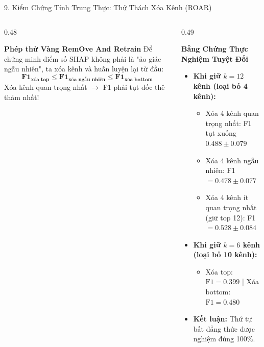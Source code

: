 \documentclass[aspectratio=169,10pt]{beamer}
\begin{document}
\begin{frame}{9. Kiểm Chứng Tính Trung Thực: Thử Thách Xóa Kênh (ROAR)}
    \begin{columns}[T]
        \begin{column}{0.48\textwidth}
            \begin{block}{\textbf{Phép thử Vàng RemOve And Retrain}}
                \footnotesize
                Để chứng minh điểm số SHAP không phải là "ảo giác ngẫu nhiên", ta xóa kênh và huấn luyện lại từ đầu:
                \[
                    \mathbf{\text{F1}_{\text{xóa top}} \le \text{F1}_{\text{xóa ngẫu nhiên}} \le \text{F1}_{\text{xóa bottom}}}
                \]
                Xóa kênh quan trọng nhất $\to$ F1 phải tụt dốc thê thảm nhất!
            \end{block}
        \end{column}
        
        \begin{column}{0.49\textwidth}
            \begin{exampleblock}{\textbf{Bằng Chứng Thực Nghiệm Tuyệt Đối}}
                \scriptsize
                \begin{itemize}
                    \item \textbf{Khi giữ $k=12$ kênh (loại bỏ 4 kênh):}
                    \begin{itemize}
                        \item Xóa 4 kênh quan trọng nhất: F1 tụt xuống $\mathbf{0.488 \pm 0.079}$
                        \item Xóa 4 kênh ngẫu nhiên: F1 $= \mathbf{0.478 \pm 0.077}$
                        \item Xóa 4 kênh ít quan trọng nhất (giữ top 12): F1 $= \mathbf{0.528 \pm 0.084}$
                    \end{itemize}
                    \item \textbf{Khi giữ $k=6$ kênh (loại bỏ 10 kênh):}
                    \begin{itemize}
                        \item Xóa top: $\text{F1} = 0.399$ \quad | \quad Xóa bottom: $\text{F1} = 0.480$
                    \end{itemize}
                    \item \textbf{Kết luận:} Thứ tự bất đẳng thức được nghiệm đúng 100\%.
                \end{itemize}
            \end{exampleblock}
        \end{column}
    \end{columns}
\end{frame}
\end{document}
